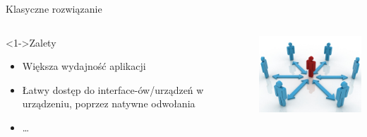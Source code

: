 \documentclass{beamer}
\begin{document}
\begin{frame}{Klasyczne rozwiązanie}
     \begin{columns}[T] %
      
     \begin{column}[T]{6cm} %
     \begin{block}<1->{Zalety}
			\begin{itemize}
    \item<1-> Większa wydajność aplikacji
    \item<2-> Łatwy dostęp do interface-ów/urządzeń w urządzeniu, poprzez natywne odwołania
    \item<3-> \dots
    \end{itemize}
	\end{block}
     \end{column}
     \begin{column}[Tc]{6cm} %
          \includegraphics[width=6cm]{multi.jpg}
     \end{column}
     \end{columns}
\end{frame}
\end{document}
